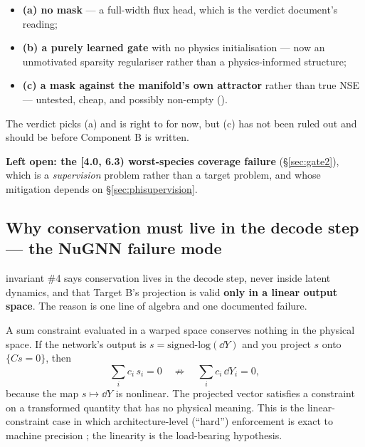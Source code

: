 \begin{itemize}
\item \textbf{(a) no mask} --- a full-width flux head, which is the verdict
  document's reading;
\item \textbf{(b) a purely learned gate} with no physics initialisation --- now
  an unmotivated sparsity regulariser rather than a physics-informed structure;
\item \textbf{(c) a mask against the manifold's own attractor} rather than true
  NSE --- untested, cheap, and possibly non-empty ().
\end{itemize}

The verdict picks (a) and is right to for now, but (c) has not been ruled out
and should be before Component B is written.

\textbf{Left open: the [4.0, 6.3) worst-species coverage failure}
(\S\ref{sec:gate2}), which is a \emph{supervision} problem rather than a target
problem, and whose mitigation depends on \S\ref{sec:phisupervision}.

\subsection{Why conservation must live in the decode step --- the NuGNN failure mode}
\label{sec:decodestep}

 invariant \#4 says conservation lives in the decode step,
never inside latent dynamics, and that Target B's projection is valid
\textbf{only in a linear output space}. The reason is one line of algebra and
one documented failure.

A sum constraint evaluated in a warped space conserves nothing in the physical
space. If the network's output is $s = \text{signed-log}(\dd Y)$ and you project
$s$ onto $\{Cs = 0\}$, then
%
\begin{equation}
\label{eq:warpedsum}
\sum_i c_i\,s_i = 0 \quad\not\Longrightarrow\quad \sum_i c_i\,\dd Y_i = 0 ,
\end{equation}
%
because the map $s \mapsto \dd Y$ is nonlinear. The projected vector satisfies
a constraint on a transformed quantity that has no physical meaning. This is
the linear-constraint case in which architecture-level (``hard'') enforcement
is exact to machine precision \citep{beucler2021}; the linearity is the
load-bearing hypothesis.

